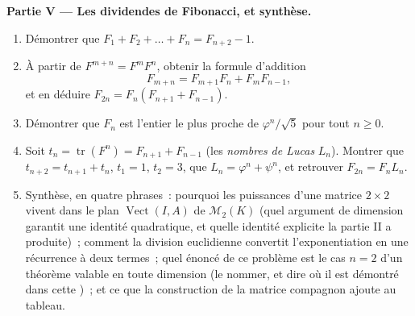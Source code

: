 \begin{problem}
\medskip
\noindent\textbf{Partie V --- Les dividendes de Fibonacci, et synthèse.}
\begin{enumerate}[resume]
  \item Démontrer que $F_1 + F_2 + \dots + F_n = F_{n+2} - 1$.
  \item À partir de $F^{m+n} = F^m F^n$, obtenir la formule d'addition
        \[
        F_{m+n} = F_{m+1}F_n + F_m F_{n-1},
        \]
        et en déduire $F_{2n} = F_n(F_{n+1} + F_{n-1})$.
  \item Démontrer que $F_n$ est l'entier le plus proche de
        $\varphi^n/\sqrt5$ pour tout $n \geq 0$.
  \item Soit $t_n = \operatorname{tr}(F^n) = F_{n+1} + F_{n-1}$
        (les \emph{nombres de Lucas} $L_n$). Montrer que $t_{n+2} =
        t_{n+1} + t_n$, $t_1 = 1$, $t_2 = 3$, que $L_n =
        \varphi^n + \psi^n$, et retrouver $F_{2n} = F_n L_n$.
  \item Synthèse, en quatre phrases~: pourquoi les puissances d'une
        matrice $2 \times 2$ vivent dans le plan
        $\operatorname{Vect}(I, A)$ de $\mathcal{M}_2(K)$ (quel
        argument de dimension garantit une identité quadratique, et
        quelle identité explicite la partie II a produite)~; comment
        la division euclidienne convertit l'exponentiation en une
        récurrence à deux termes~; quel énoncé de ce problème est le
        cas $n = 2$ d'un théorème valable en toute dimension (le
        nommer, et dire où il est démontré dans cette )~; et ce
        que la construction de la matrice compagnon ajoute au tableau.
\end{enumerate}
\end{problem}
